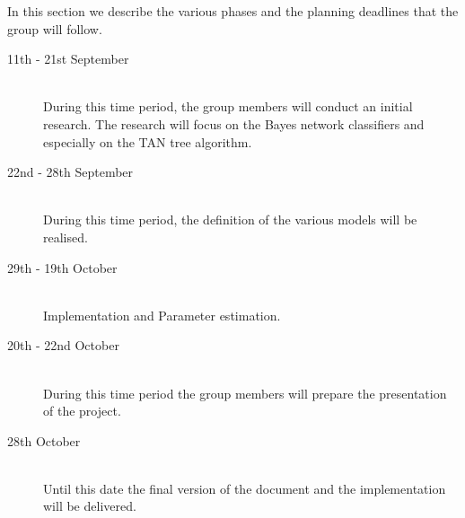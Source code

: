 \documentclass[a4paper, 11pt]{scrartcl}
\begin{document}
In this section we describe the various phases and the planning deadlines that the group will follow.

\begin{description}
	\item[11th - 21st September]\-\\
	During this time period, the group members will conduct an initial research. The research will focus on the Bayes network classifiers and especially on the TAN tree algorithm.
	\item[22nd - 28th September]\-\\
	During this time period, the definition of the various models will be realised.
	\item[29th - 19th October]\-\\
	Implementation and Parameter estimation.
	\item[20th - 22nd October]\-\\
	During this time period the group members will prepare the presentation of the project.
	\item[28th October]\-\\
	Until this date the final version of the document and the implementation will be delivered.
\end{description}


\nocite{*} %


\end{document}
